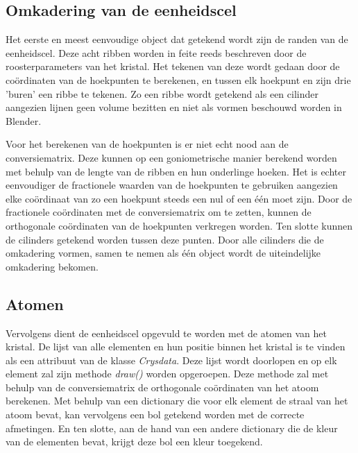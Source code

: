 \subsection{Omkadering van de eenheidscel}
Het eerste en meest eenvoudige object dat getekend wordt zijn de randen van de eenheidscel. Deze acht ribben worden in feite reeds beschreven door de roosterparameters van het kristal. Het tekenen van deze wordt gedaan door de coördinaten van de hoekpunten te berekenen, en tussen elk hoekpunt en zijn drie 'buren' een ribbe te tekenen. Zo een ribbe wordt getekend als een cilinder aangezien lijnen geen volume bezitten en niet als vormen beschouwd worden in Blender. 
\par
Voor het berekenen van de hoekpunten is er niet echt nood aan de conversiematrix. Deze kunnen op een goniometrische manier berekend worden met behulp van de lengte van de ribben en hun onderlinge hoeken. Het is echter eenvoudiger de fractionele waarden van de hoekpunten te gebruiken aangezien elke coördinaat van zo een hoekpunt steeds een nul of een één moet zijn. Door de fractionele coördinaten met de conversiematrix om te zetten, kunnen de orthogonale coördinaten van de hoekpunten verkregen worden. Ten slotte kunnen de cilinders getekend worden tussen deze punten. Door alle cilinders die de omkadering vormen, samen te nemen als één object wordt de uiteindelijke omkadering bekomen.
\par
\subsection{Atomen}
Vervolgens dient de eenheidscel opgevuld te worden met de atomen van het kristal. De lijst van alle elementen en hun positie binnen het kristal is te vinden als een attribuut van de klasse \textit{Crysdata}. Deze lijst wordt doorlopen en op elk element zal zijn methode \textit{draw()} worden opgeroepen. Deze methode zal met behulp van de conversiematrix de orthogonale coördinaten van het atoom berekenen. Met behulp van een dictionary die voor elk element de straal van het atoom bevat, kan vervolgens een bol getekend worden met de correcte afmetingen. En ten slotte, aan de hand van een andere dictionary die de kleur van de elementen bevat, krijgt deze bol een kleur toegekend. 
\par
